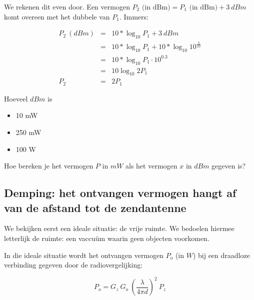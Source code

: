 We rekenen dit even door. Een vermogen $P_2 \text{ (in dBm)} = P_1 \text{ (in dBm)} + 3~dBm$ komt overeen met het dubbele van $P_1$. Immers: 

\begin{eqnarray*}
    P_2~(dBm)&=& 10*\log_{10} P_1 + 3~dBm \\
    &=& 10*\log_{10} P_1 + 10*\log_{10} 10^{\frac{3}{10}} \\
    &=& 10*\log_{10} P_1 \cdot 10^{0.3}\\
    &=& 10 \log_{10} 2 P_1 \\
    P_2 &=& 2 P_1
\end{eqnarray*}

\begin{oef}
Hoeveel $dBm$ is 
\begin{itemize}
    \item 10 mW
    \item 250 mW
    \item 100 W
\end{itemize}
\end{oef}

\begin{oef}
Hoe bereken je het vermogen $P$ in $mW$ als het vermogen $x$ in $dBm$ gegeven is?
\end{oef}

\subsection{Demping: het ontvangen vermogen hangt af van de afstand tot de zendantenne}

We bekijken eerst een ideale situatie: de vrije ruimte. We bedoelen hiermee letterlijk de ruimte: een vaccu\"um waarin geen objecten voorkomen.

In die ideale situatie wordt het ontvangen vermogen $P_o$ (in $W$) bij een draadloze verbinding gegeven door de radiovergelijking:

\begin{equation}
    P_o = G_z ~ G_o ~ (\frac{\lambda}{4 \pi d})^2 ~P_z
    \label{eq:radiovgl}
\end{equation}

